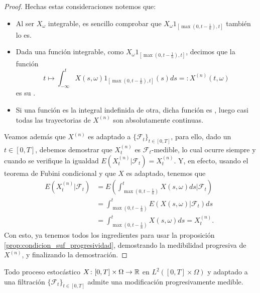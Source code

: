 \begin{proof}
    Hechas estas consideraciones notemos que:
    \begin{itemize}
        \item Al ser $X_\omega$ integrable, es sencillo comprobar que $X_\omega1_{[\max(0,t-\frac{1}{n}),t]}$ también lo es.
        \item Dada una función integrable, como $X_\omega1_{[\max(0,t-\frac{1}{n}),t]}$, decimos que la función
              \begin{equation}
                  t\mapsto\int_{-\infty}^{t}X(s,\omega)1_{[\max(0,t-\frac{1}{n}),t]}(s)ds=:X^{(n)}(t,\omega)
              \end{equation}
              es su .
        \item Si una función es la integral indefinida de otra, dicha función es , luego casi todas las trayectorias de $X^{(n)}$ son absolutamente continuas.
    \end{itemize}
    Veamos además que $X^{(n)}$ es adaptado a $\{\mathcal{F}_t\}_{t\in[0,T]}$, para ello, dado un $t\in[0,T]$, debemos demostrar que $X_t^{(n)}$ es $\mathcal{F}_t$-medible, lo cual ocurre siempre y cuando se verifique la igualdad $E(X_t^{(n)}|\mathcal{F}_t)=X_t^{(n)}$. Y, en efecto, usando el teorema de Fubini condicional y que $X$ es adaptado, tenemos que
    \begin{equation}
        \begin{aligned}
            E(X_t^{(n)}|\mathcal{F}_t) & =E\left(\int_{\max(0, t-\frac{1}{n})}^{t}X(s,\omega)ds|\mathcal{F}_t\right) \\
                                       & =\int_{\max(0, t-\frac{1}{n})}^{t}E\left(X(s,\omega)|\mathcal{F}_t\right)ds
            \\
                                       & =\int_{\max(0, t-\frac{1}{n})}^{t}X(s,\omega)ds=X_t^{(n)}\text{. }
        \end{aligned}
    \end{equation}
    Con esto, ya tenemos todos los ingredientes para usar la proposición \ref{prop:condicion_suf_progresividad}, demostrando la medibilidad progresiva de $X^{(n)}$, y finalizando la demostración.
\end{proof}
\begin{teorema}
    Todo proceso estocástico $X\colon[0,T]\times\Omega\to\mathbb{R}$ en $L^2([0,T]\times\Omega)$ y adaptado a una filtración $\{\mathcal{F}_t\}_{t\in[0,T]}$ admite una modificación progresivamente medible.
\end{teorema}
